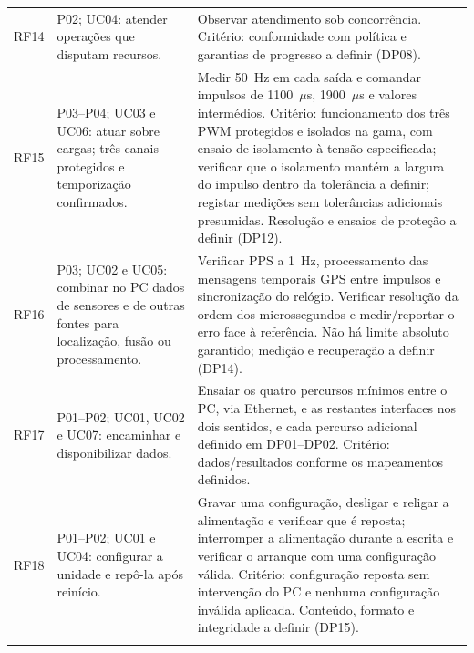 \begin{longtable}{@{}>{\raggedright\arraybackslash}p{}>{\raggedright\arraybackslash}p{}>{\raggedright\arraybackslash}p{}@{}}
\addlinespace
RF14 & P02; UC04: atender operações que disputam recursos. & Observar atendimento sob concorrência. Critério: conformidade com política e garantias de progresso a definir (DP08). \\
\addlinespace
RF15 & P03--P04; UC03 e UC06: atuar sobre cargas; três canais protegidos e temporização confirmados. & Medir 50~Hz em cada saída e comandar impulsos de 1100~$\mu$s, 1900~$\mu$s e valores intermédios. Critério: funcionamento dos três PWM protegidos e isolados na gama, com ensaio de isolamento à tensão especificada; verificar que o isolamento mantém a largura do impulso dentro da tolerância a definir; registar medições sem tolerâncias adicionais presumidas. Resolução e ensaios de proteção a definir (DP12). \\
\addlinespace
RF16 & P03; UC02 e UC05: combinar no PC dados de sensores e de outras fontes para localização, fusão ou processamento. & Verificar PPS a 1~Hz, processamento das mensagens temporais GPS entre impulsos e sincronização do relógio. Verificar resolução da ordem dos microssegundos e medir/reportar o erro face à referência. Não há limite absoluto garantido; medição e recuperação a definir (DP14). \\
\addlinespace
RF17 & P01--P02; UC01, UC02 e UC07: encaminhar e disponibilizar dados. & Ensaiar os quatro percursos mínimos entre o PC, via Ethernet, e as restantes interfaces nos dois sentidos, e cada percurso adicional definido em DP01--DP02. Critério: dados/resultados conforme os mapeamentos definidos. \\
\addlinespace
RF18 & P01--P02; UC01 e UC04: configurar a unidade e repô-la após reinício. & Gravar uma configuração, desligar e religar a alimentação e verificar que é reposta; interromper a alimentação durante a escrita e verificar o arranque com uma configuração válida. Critério: configuração reposta sem intervenção do PC e nenhuma configuração inválida aplicada. Conteúdo, formato e integridade a definir (DP15). \\
\addlinespace
\end{longtable}
\endgroup


